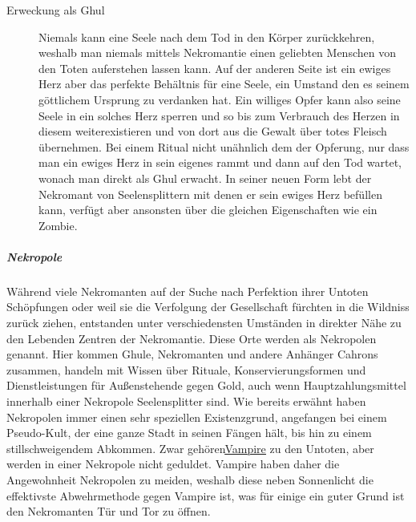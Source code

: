 \documentclass[a4paper,12pt,oneside]{book}
\begin{document}
\begin{description}
\item[Erweckung als Ghul] Niemals kann eine Seele nach dem Tod in den Körper zurückkehren, weshalb man niemals mittels Nekromantie einen geliebten Menschen von den Toten auferstehen lassen kann. Auf der anderen Seite ist ein ewiges Herz aber das perfekte Behältnis für eine Seele, ein Umstand den es seinem göttlichem Ursprung zu verdanken hat. Ein williges Opfer kann also seine Seele in ein solches Herz sperren und so bis zum Verbrauch des Herzen in diesem weiterexistieren und von dort aus die Gewalt über totes Fleisch übernehmen. Bei einem Ritual nicht unähnlich dem der Opferung, nur dass man ein ewiges Herz in sein eigenes rammt und dann auf den Tod wartet, wonach man direkt als Ghul erwacht. In seiner neuen Form lebt der Nekromant von Seelensplittern mit denen er sein ewiges Herz befüllen kann, verfügt aber ansonsten über die gleichen Eigenschaften wie ein Zombie.
\end{description}
\subparagraph{Nekropole}\label{Nekropole}
Während viele Nekromanten auf der Suche nach Perfektion ihrer Untoten Schöpfungen oder weil sie die Verfolgung der Gesellschaft fürchten in die Wildniss zurück ziehen, entstanden unter verschiedensten Umständen in direkter Nähe zu den Lebenden Zentren der Nekromantie. Diese Orte werden als Nekropolen genannt. Hier kommen Ghule, Nekromanten und andere Anhänger Cahrons zusammen, handeln mit Wissen über Rituale, Konservierungsformen und Dienstleistungen für Außenstehende gegen Gold, auch wenn Hauptzahlungsmittel innerhalb einer Nekropole Seelensplitter sind. Wie bereits erwähnt haben Nekropolen immer einen sehr speziellen Existenzgrund, angefangen bei einem Pseudo-Kult, der eine ganze Stadt in seinen Fängen hält, bis hin zu einem stillschweigendem Abkommen. Zwar gehören\uline{\hyperref[Vampir]{Vampire}} zu den Untoten, aber werden in einer Nekropole nicht geduldet. Vampire haben daher die Angewohnheit Nekropolen zu meiden, weshalb diese neben Sonnenlicht die effektivste Abwehrmethode gegen Vampire ist, was für einige ein guter Grund ist den Nekromanten Tür und Tor zu öffnen.
\end{document}
